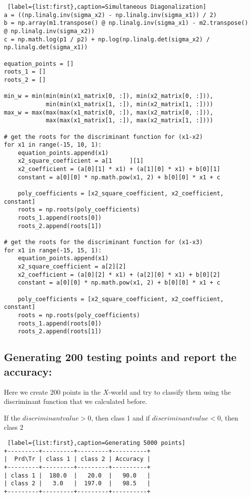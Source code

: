 \documentclass[11pt, oneside]{article}   	%
\begin{document}
\begin{lstlisting} [label={list:first},caption=Simultaneous Diagonalization]
a = ((np.linalg.inv(sigma_x2) - np.linalg.inv(sigma_x1)) / 2)
b = np.array(m1.transpose() @ np.linalg.inv(sigma_x1) - m2.transpose() @ np.linalg.inv(sigma_x2))
c = np.math.log(p1 / p2) + np.log(np.linalg.det(sigma_x2) / np.linalg.det(sigma_x1))

equation_points = []
roots_1 = []
roots_2 = []

min_w = min(min(min(x1_matrix[0, :]), min(x2_matrix[0, :])),
            min(min(x1_matrix[1, :]), min(x2_matrix[1, :])))
max_w = max(max(max(x1_matrix[0, :]), max(x2_matrix[0, :])),
            max(max(x1_matrix[1, :]), max(x2_matrix[1, :])))

# get the roots for the discriminant function for (x1-x2)
for x1 in range(-15, 10, 1):
    equation_points.append(x1)
    x2_square_coefficient = a[1 	][1]
    x2_coefficient = (a[0][1] * x1) + (a[1][0] * x1) + b[0][1]
    constant = a[0][0] * np.math.pow(x1, 2) + b[0][0] * x1 + c

    poly_coefficients = [x2_square_coefficient, x2_coefficient, constant]
    roots = np.roots(poly_coefficients)
    roots_1.append(roots[0])
    roots_2.append(roots[1])

# get the roots for the discriminant function for (x1-x3) 
for x1 in range(-15, 15, 1):
    equation_points.append(x1)
    x2_square_coefficient = a[2][2]
    x2_coefficient = (a[0][2] * x1) + (a[2][0] * x1) + b[0][2]
    constant = a[0][0] * np.math.pow(x1, 2) + b[0][0] * x1 + c

    poly_coefficients = [x2_square_coefficient, x2_coefficient, constant]
    roots = np.roots(poly_coefficients)
    roots_1.append(roots[0])
    roots_2.append(roots[1])

\end{lstlisting}

\subsection{Generating 200 testing points and report the accuracy:}
Here we create 200 points in the $X$-world and try to classify them using the discriminant function that we calculated before.

If the $discriminant value > 0$, then class 1
and if $discriminant value < 0$, then class 2

\begin{lstlisting} [label={list:first},caption=Generating 5000 points]
+---------+---------+---------+----------+
|  Prd\Tr | class 1 | class 2 | Accuracy |
+---------+---------+---------+----------+
| class 1 |  180.0  |   20.0  |   90.0   |
| class 2 |   3.0   |  197.0  |   98.5   |
+---------+---------+---------+----------+
\end{lstlisting}
\end{document}
